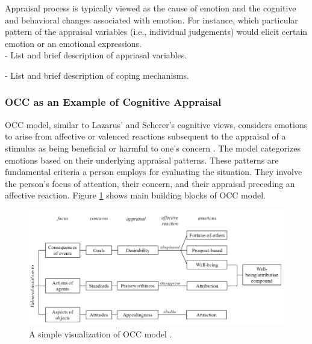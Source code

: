 \documentclass[11pt]{article}
\begin{document}
Appraisal process is typically viewed as the cause of emotion and the cognitive
and behavioral changes associated with emotion. For instance, which particular
pattern of the appraisal variables (i.e., individual judgements) would elicit
certain emotion or an emotional expressions.\\

- List and brief description of appriasal variables.

- List and brief description of coping mechanisms.\\

\subsubsection{OCC as an Example of Cognitive Appraisal}

OCC model, similar to Lazarus' \cite{lazarus:cognitive-theory-emotion} and
Scherer's \cite{scherer:nature-function-emotion} cognitive views, considers
emotions to arise from affective or valenced reactions subsequent to the
appraisal of a stimulus as being beneficial or harmful to one’s concern
\cite{occ:structure}. The model categorizes emotions based on their underlying
appraisal patterns. These patterns are fundamental criteria a person employs for
evaluating the situation. They involve the person’s focus of attention, their
concern, and their appraisal preceding an affective reaction. Figure
\ref{fig:occ-model} shows main building blocks of OCC model.

\begin{figure}[tbh]
  \center
  \includegraphics[width=\textwidth]{figure/occ.png}
  \caption{A simple visualization of OCC model \cite{occ:structure}.}
  \label{fig:occ-model}
\end{figure}
\end{document}
